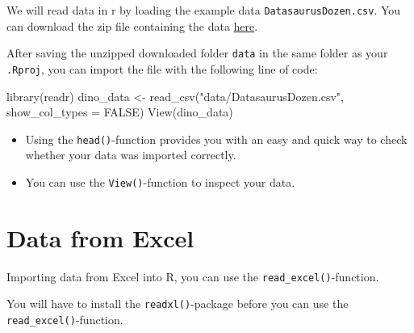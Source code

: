 \documentclass[
  letterpaper,
  DIV=11,
  numbers=noendperiod,
  oneside]{scrreprt}
\newenvironment{Shaded}{\begin{snugshade}}{\end{snugshade}}
\newcommand{\AttributeTok}[1]{\textcolor[rgb]{0.40,0.45,0.13}{#1}}
\newcommand{\ConstantTok}[1]{\textcolor[rgb]{0.56,0.35,0.01}{#1}}
\newcommand{\FunctionTok}[1]{\textcolor[rgb]{0.28,0.35,0.67}{#1}}
\newcommand{\NormalTok}[1]{\textcolor[rgb]{0.00,0.23,0.31}{#1}}
\newcommand{\OtherTok}[1]{\textcolor[rgb]{0.00,0.23,0.31}{#1}}
\newcommand{\StringTok}[1]{\textcolor[rgb]{0.13,0.47,0.30}{#1}}
\providecommand{\tightlist}{%
  \setlength{\itemsep}{0pt}\setlength{\parskip}{0pt}}\usepackage{longtable,booktabs,array}
\begin{document}
We will read data in r by loading the example data
\texttt{DatasaurusDozen.csv}. You can download the zip file containing
the data \href{./downloadable_files/data.zip}{here}.

After saving the unzipped downloaded folder \texttt{data} in the same
folder as your \texttt{.Rproj}, you can import the file with the
following line of code:

\begin{Shaded}
\begin{Highlighting}[]
\FunctionTok{library}\NormalTok{(readr)}
\NormalTok{dino\_data }\OtherTok{\textless{}{-}} \FunctionTok{read\_csv}\NormalTok{(}\StringTok{"data/DatasaurusDozen.csv"}\NormalTok{, }\AttributeTok{show\_col\_types =} \ConstantTok{FALSE}\NormalTok{)}
\FunctionTok{View}\NormalTok{(dino\_data)}
\end{Highlighting}
\end{Shaded}

\begin{tcolorbox}[enhanced jigsaw, leftrule=.75mm, colframe=quarto-callout-tip-color-frame, left=2mm, breakable, bottomrule=.15mm, rightrule=.15mm, colback=white, opacityback=0, arc=.35mm, toprule=.15mm]
\begin{minipage}[t]{5.5mm}
\textcolor{quarto-callout-tip-color}{\faLightbulb}
\end{minipage}%
\begin{minipage}[t]{\textwidth - 5.5mm}

\begin{itemize}
\tightlist
\item
  Using the \texttt{head()}-function provides you with an easy and quick
  way to check whether your data was imported correctly.
\item
  You can use the \texttt{View()}-function to inspect your data.
\end{itemize}

\end{minipage}%
\end{tcolorbox}

\hypertarget{data-from-excel}{%
\section{Data from Excel}\label{data-from-excel}}

Importing data from Excel into R, you can use the
\texttt{read\_excel()}-function.

\begin{tcolorbox}[enhanced jigsaw, leftrule=.75mm, colframe=quarto-callout-important-color-frame, left=2mm, breakable, bottomrule=.15mm, rightrule=.15mm, colback=white, opacityback=0, arc=.35mm, toprule=.15mm]
\begin{minipage}[t]{5.5mm}
\textcolor{quarto-callout-important-color}{\faExclamation}
\end{minipage}%
\begin{minipage}[t]{\textwidth - 5.5mm}

You will have to install the \texttt{readxl()}-package before you can
use the \texttt{read\_excel()}-function.

\end{minipage}%
\end{tcolorbox}
\end{document}
